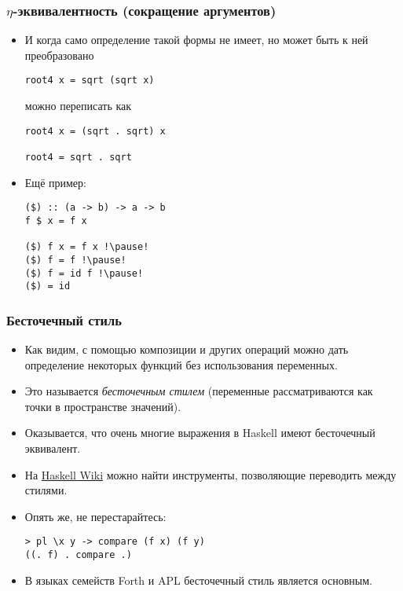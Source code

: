 \documentclass[10pt]{beamer}
\begin{document}
\begin{frame}[fragile]
\frametitle{$\eta$-эквивалентность (сокращение аргументов)}
\begin{itemize}
    \item И когда само определение такой формы не имеет, но может быть к ней преобразовано
\begin{lstlisting}
root4 x = sqrt (sqrt x)
\end{lstlisting}
можно переписать как
\begin{lstlisting}
root4 x = (sqrt . sqrt) x

root4 = sqrt . sqrt
\end{lstlisting}
    \item Ещё пример:
\begin{lstlisting}
($) :: (a -> b) -> a -> b
f $ x = f x

($) f x = f x !\pause!
($) f = f !\pause!
($) f = id f !\pause!
($) = id
\end{lstlisting}
\end{itemize}
\end{frame}

\begin{frame}[fragile]
\frametitle{Бесточечный стиль}
\begin{itemize}
    \item Как видим, с помощью композиции и других операций можно дать определение некоторых функций без использования переменных.
    \item Это называется \emph{бесточечным стилем} (переменные рассматриваются как точки в пространстве значений).\pause
    \item Оказывается, что очень многие выражения в Haskell имеют бесточечный эквивалент.
    \item На \href{https://wiki.haskell.org/Pointfree}{Haskell Wiki} можно найти инструменты, позволяющие переводить между стилями.
    \item Опять же, не перестарайтесь:
\begin{lstlisting}
> pl \x y -> compare (f x) (f y)
((. f) . compare .)
\end{lstlisting}\pause
    \item В языках семейств Forth и APL бесточечный стиль является основным.
\end{itemize}
\end{frame}
\end{document}
